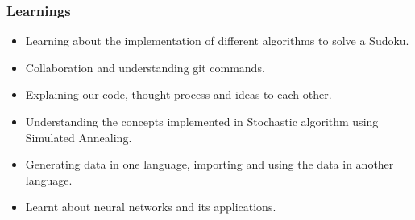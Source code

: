 \documentclass{beamer}
\begin{document}
\begin{frame}
     \frametitle{Learnings}
     \begin{itemize}
     \item Learning about the implementation of different algorithms to solve a Sudoku.
     \item Collaboration and understanding git commands.
	 \item Explaining our code, thought process and ideas to each other.
	 \item Understanding the concepts implemented in Stochastic algorithm using Simulated Annealing.
	 \item Generating data in one language, importing and using the data in another language.
	 \item Learnt about neural networks and its applications.
\end{itemize}         
\end{frame}
\end{document}
